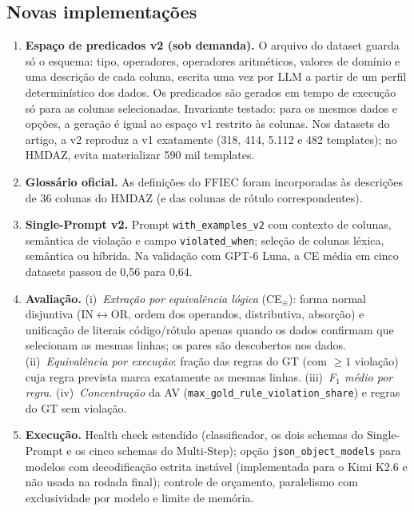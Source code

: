 \documentclass[11pt,a4paper]{article}
\begin{document}
\subsection{Novas implementações}
\begin{enumerate}
  \item \textbf{Espaço de predicados v2 (sob demanda).} O arquivo do dataset guarda só o esquema: tipo,
        operadores, operadores aritméticos, valores de domínio e uma descrição de cada coluna, escrita uma vez
        por LLM a partir de um perfil determinístico dos dados. Os predicados são gerados em tempo de execução
        só para as colunas selecionadas. Invariante testado: para os mesmos dados e opções, a geração é igual
        ao espaço v1 restrito às colunas. Nos datasets do artigo, a v2 reproduz a v1 exatamente (318, 414,
        5.112 e 482 templates); no HMDAZ, evita materializar 590 mil templates.
  \item \textbf{Glossário oficial.} As definições do FFIEC foram incorporadas às descrições de 36 colunas do
        HMDAZ (e das colunas de rótulo correspondentes).
  \item \textbf{Single-Prompt v2.} Prompt \texttt{with\_examples\_v2} com contexto de colunas, semântica de
        violação e campo \texttt{violated\_when}; seleção de colunas léxica, semântica ou híbrida. Na
        validação com GPT-6 Luna, a CE média em cinco datasets passou de 0,56 para 0,64.
  \item \textbf{Avaliação.}
        (i)~\emph{Extração por equivalência lógica} (CE$_\equiv$): forma normal disjuntiva (IN$\leftrightarrow$OR,
        ordem dos operandos, distributiva, absorção) e unificação de literais código/rótulo apenas quando os
        dados confirmam que selecionam as mesmas linhas; os pares são descobertos nos dados.
        (ii)~\emph{Equivalência por execução}: fração das regras do GT (com $\geq 1$ violação) cuja regra prevista
        marca exatamente as mesmas linhas. (iii)~\emph{F$_1$ médio por regra}. (iv)~\emph{Concentração} da AV
        (\texttt{max\_gold\_rule\_violation\_share}) e regras do GT sem violação.
  \item \textbf{Execução.} Health check estendido (classificador, os dois schemas do Single-Prompt e os cinco
        schemas do Multi-Step); opção \texttt{json\_object\_models} para modelos com decodificação estrita
        instável (implementada para o Kimi K2.6 e não usada na rodada final); controle de orçamento,
        paralelismo com exclusividade por modelo e limite de memória.
\end{enumerate}
\end{document}
